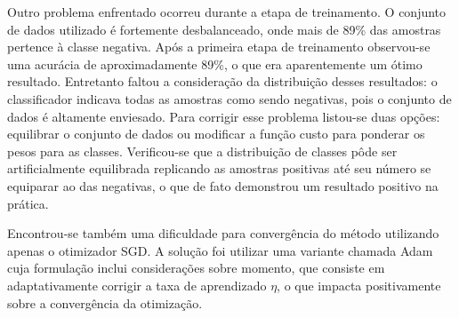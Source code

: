 Outro problema enfrentado ocorreu durante a etapa de treinamento. O conjunto de dados utilizado é fortemente desbalanceado, onde mais de 89\% das amostras pertence à classe negativa. Após a primeira etapa de treinamento observou-se uma acurácia de aproximadamente 89\%, o que era aparentemente um ótimo resultado. Entretanto faltou a consideração da distribuição desses resultados: o classificador indicava todas as amostras como sendo negativas, pois o conjunto de dados é altamente enviesado. Para corrigir esse problema listou-se duas opções: equilibrar o conjunto de dados ou modificar a função custo para ponderar os pesos para as classes. Verificou-se que a distribuição de classes pôde ser artificialmente equilibrada replicando as amostras positivas até seu número se equiparar ao das negativas, o que de fato demonstrou um resultado positivo na prática.

Encontrou-se também uma dificuldade para convergência do método utilizando apenas o otimizador SGD. A solução foi utilizar uma variante chamada Adam cuja formulação inclui considerações sobre momento, que consiste em adaptativamente corrigir a taxa de aprendizado $\eta$, o que impacta positivamente sobre a convergência da otimização.

